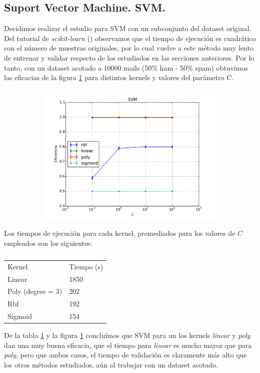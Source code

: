 \documentclass[a4paper,10pt]{article}
\begin{document}
\subsection{Suport Vector Machine. SVM.}

\par Decidimos realizar el estudio para SVM con un subconjunto del dataset original. Del tutorial de \emph{scikit-learn} (\cite{sklearn}) observamos que el tiempo de ejecución es cuadrático con el número de muestras originales, por lo cual vuelve a este método muy lento de entrenar y validar respecto de los estudiados en las secciones anteriores. Por lo tanto, con un dataset acotado a 10000 mails (50\% ham - 50\% spam) obtuvimos las eficacias de la figura \ref{fig:svm} para distintos kernels y valores del parámetro C.

\begin{figure}[H]
  \centering
  \begin{subfigure}[b]{0.4\textwidth}
    \includegraphics[width=\textwidth]{../imagenes/SVM}
     \caption{}
  \end{subfigure}
  \label{fig:svm}
\end{figure}

\par Los tiempos de ejecución para cada kernel, promediados para los valores de $C$ empleados son los siguientes:
\begin{table}[H]
\centering
\caption{}
\label{table:time_svm}
\begin{tabular}{ll}
Kernel & Tiempo (s) \\
Linear & 1850 \\
Poly (degree = 3) & 202 \\
Rbf & 192 \\
Sigmoid & 154 \\
\end{tabular}
\end{table}
De la tabla \ref{table:time_svm} y la figura \ref{fig:svm} concluímos que SVM para un los kernels \emph{linear} y \emph{poly} dan una muy buena eficacia, que el tiempo para \emph{linear} es mucho mayor que para \emph{poly}, pero que ambos casos, el tiempo de validación es claramente más alto que los otros métodos estudiados, aún al trabajar con un dataset acotado.
\end{document}
